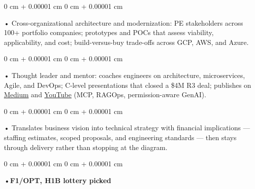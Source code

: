 \documentclass[10pt, letterpaper]{article}
\newenvironment{onecolentry}{
    \begin{adjustwidth}{
        0 cm + 0.00001 cm
    }{
        0 cm + 0.00001 cm
    }
}{
    \end{adjustwidth}
} %
\begin{document}
        \begin{onecolentry}
            • Cross-organizational architecture and modernization: PE stakeholders across 100+ portfolio companies; prototypes and POCs that assess viability, applicability, and cost; build-versus-buy trade-offs across GCP, AWS, and Azure.
        \end{onecolentry}
        \begin{onecolentry}
            • Thought leader and mentor: coaches engineers on architecture, microservices, Agile, and DevOps; C-level presentations that closed a \$4M R3 deal; publishes on \href{https://medium.com/@sreenikethaathreya}{Medium} and \href{https://www.youtube.com/@sreenikethaathreya7555}{YouTube} (MCP, RAGOps, permission-aware GenAI).
        \end{onecolentry}
        \begin{onecolentry}
            • Translates business vision into technical strategy with financial implications --- staffing estimates, scoped proposals, and engineering standards --- then stays through delivery rather than stopping at the diagram.
        \end{onecolentry}
        \begin{onecolentry}
                \textbf{•F1/OPT, H1B lottery picked}
        \end{onecolentry}

    \vspace{2 pt }
\end{document}
